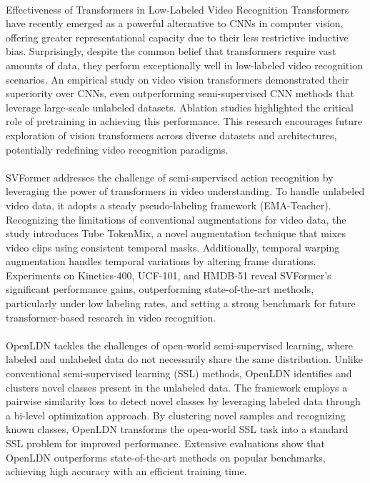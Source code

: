 \documentclass[11pt,a4paper]{report}
\begin{document}
\paragraph{} Effectiveness of Transformers in Low-Labeled Video Recognition
Transformers \cite{rahman2022surprising} have recently emerged as a powerful alternative to CNNs in computer vision, offering greater representational capacity due to their less restrictive inductive bias. Surprisingly, despite the common belief that transformers require vast amounts of data, they perform exceptionally well in low-labeled video recognition scenarios. An empirical study on video vision transformers demonstrated their superiority over CNNs, even outperforming semi-supervised CNN methods that leverage large-scale unlabeled datasets. Ablation studies highlighted the critical role of pretraining in achieving this performance. This research encourages future exploration of vision transformers across diverse datasets and architectures, potentially redefining video recognition paradigms.

\paragraph{}
SVFormer \cite{xing2023svformer} addresses the challenge of semi-supervised action recognition by leveraging the power of transformers in video understanding. To handle unlabeled video data, it adopts a steady pseudo-labeling framework (EMA-Teacher). Recognizing the limitations of conventional augmentations for video data, the study introduces Tube TokenMix, a novel augmentation technique that mixes video clips using consistent temporal masks. Additionally, temporal warping augmentation handles temporal variations by altering frame durations. Experiments on Kinetics-400, UCF-101, and HMDB-51 reveal SVFormer’s significant performance gains, outperforming state-of-the-art methods, particularly under low labeling rates, and setting a strong benchmark for future transformer-based research in video recognition.

\paragraph{} 
OpenLDN  \cite{Rizve2022OpenLDNLT} tackles the challenges of open-world semi-supervised learning, where labeled and unlabeled data do not necessarily share the same distribution. Unlike conventional semi-supervised learning (SSL) methods, OpenLDN identifies and clusters novel classes present in the unlabeled data. The framework employs a pairwise similarity loss to detect novel classes by leveraging labeled data through a bi-level optimization approach. By clustering novel samples and recognizing known classes, OpenLDN transforms the open-world SSL task into a standard SSL problem for improved performance. Extensive evaluations show that OpenLDN outperforms state-of-the-art methods on popular benchmarks, achieving high accuracy with an efficient training time.
\end{document}
